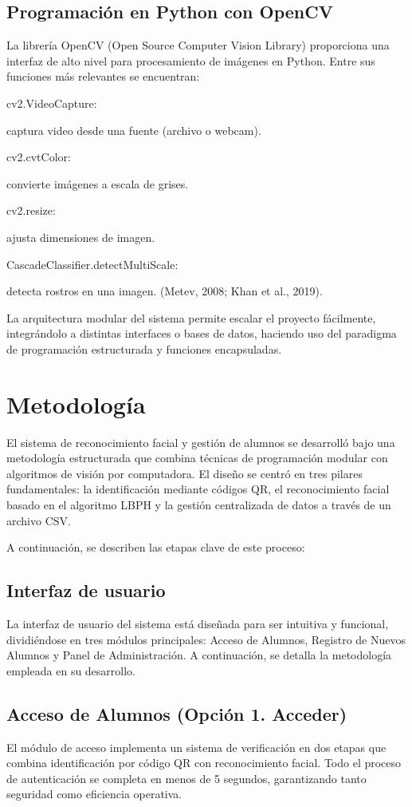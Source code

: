 \documentclass[12pt]{article}
\begin{document}
{\subsection{Programación en Python con OpenCV}
La librería OpenCV (Open Source Computer Vision Library) proporciona una interfaz de alto nivel para procesamiento de imágenes en Python. Entre sus funciones más relevantes se encuentran:
\begin{itemize}
    {\bfseries\item cv2.VideoCapture:} captura video desde una fuente (archivo o webcam).
    {\bfseries\item cv2.cvtColor:} convierte imágenes a escala de grises.
    {\bfseries\item cv2.resize:} ajusta dimensiones de imagen.
    {\bfseries\item CascadeClassifier.detectMultiScale:} detecta rostros en una imagen. (Metev, 2008; Khan et al., 2019).
\end{itemize}

La arquitectura modular del sistema permite escalar el proyecto fácilmente, integrándolo a distintas interfaces o bases de datos, haciendo uso del paradigma de programación estructurada y funciones encapsuladas.

\section{Metodología}
El sistema de reconocimiento facial y gestión de alumnos se desarrolló bajo una metodología estructurada que combina técnicas de programación modular con algoritmos de visión por computadora. El diseño se centró en tres pilares fundamentales: la identificación mediante códigos QR, el reconocimiento facial basado en el algoritmo LBPH y la gestión centralizada de datos a través de un archivo CSV.

A continuación, se describen las etapas clave de este proceso:

\subsection{Interfaz de usuario}
La interfaz de usuario del sistema está diseñada para ser intuitiva y funcional, dividiéndose en tres módulos principales: Acceso de Alumnos, Registro de Nuevos Alumnos y Panel de Administración. A continuación, se detalla la metodología empleada en su desarrollo.

\subsection{Acceso de Alumnos (Opción 1. Acceder)}
El módulo de acceso implementa un sistema de verificación en dos etapas que combina identificación por código QR con reconocimiento facial. Todo el proceso de autenticación se completa en menos de 5 segundos, garantizando tanto seguridad como eficiencia operativa.

}
\end{document}
